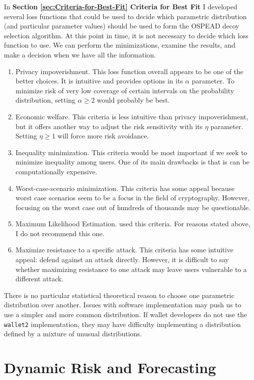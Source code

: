 \documentclass[english]{article}
\begin{document}
In \textbf{Section \ref{sec:Criteria-for-Best-Fit} Criteria for Best
Fit} I developed several loss functions that could be used to decide
which parametric distribution (and particular parameter values) should
be used to form the OSPEAD decoy selection algorithm. At this point
in time, it is not necessary to decide which loss function to use.
We can perform the minimizations, examine the results, and make a
decision when we have all the information.
\begin{enumerate}
\item Privacy impoverishment. This loss function overall appears to be one
of the better choices. It is intuitive and provides options in its
$\alpha$ parameter. To minimize risk of very low coverage of certain
intervals on the probability distribution, setting $\alpha\geq2$
would probably be best.
\item Economic welfare. This criteria is less intuitive than privacy impoverishment,
but it offers another way to adjust the risk sensitivity with its
$\eta$ parameter. Setting $\eta\geq1$ will force more risk avoidance.
\item Inequality minimization. This criteria would be most important if
we seek to minimize inequality among users. One of its main drawbacks
is that is can be computationally expensive.
\item Worst-case-scenario minimization. This criteria has some appeal because
worst case scenarios seem to be a focus in the field of cryptography.
However, focusing on the worst case out of hundreds of thousands may
be questionable.
\item Maximum Likelihood Estimation. \cite{2018} used this criteria. For
reasons stated above, I do not recommend this one.
\item Maximize resistance to a specific attack. This criteria has some intuitive
appeal: defend against an attack directly. However, it is difficult
to say whether maximizing resistance to one attack may leave users
vulnerable to a different attack.
\end{enumerate}
There is no particular statistical theoretical reason to choose one
parametric distribution over another. Issues with software implementation
may push us to use a simpler and more common distribution. If wallet
developers do not use the \texttt{wallet2} implementation, they may
have difficulty implementing a distribution defined by a mixture of
unusual distributions.

\newpage{}

\section{Dynamic Risk and Forecasting\label{sec:Dynamic-Risk-and-Forecasting}}
\end{document}
